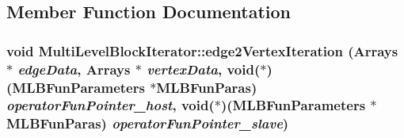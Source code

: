 \subsection{Member Function Documentation}
\hypertarget{classMultiLevelBlockIterator_ac43a134b15498ad6e7eec873b2f45f79}{
\subsubsection[{edge2VertexIteration}]{\setlength{\rightskip}{0pt plus 5cm}void MultiLevelBlockIterator::edge2VertexIteration ({\bf Arrays} $\ast$ {\em edgeData}, \/  {\bf Arrays} $\ast$ {\em vertexData}, \/  void($\ast$)({\bf MLBFunParameters} $\ast$MLBFunParas) {\em operatorFunPointer\_\-host}, \/  void($\ast$)({\bf MLBFunParameters} $\ast$MLBFunParas) {\em operatorFunPointer\_\-slave})}}
\label{classMultiLevelBlockIterator_ac43a134b15498ad6e7eec873b2f45f79}


